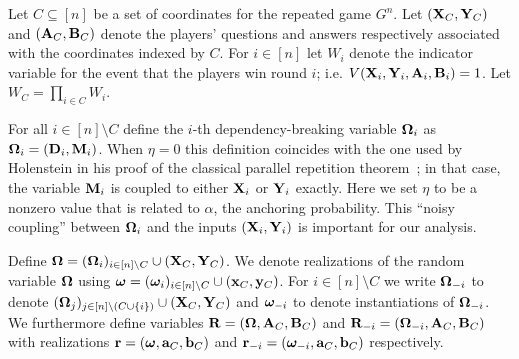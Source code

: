 Let $C \subseteq [n]$ be a set of coordinates for the repeated game $G^n$. 
Let $(\mathbf{X}_C,\mathbf{Y}_C)$ and $(\mathbf{A}_C,\mathbf{B}_C)$ denote the players' questions and answers respectively associated with the coordinates indexed by $C$. For $i \in [n]$ let $W_i$ denote the indicator variable for the event that the players win round $i$; i.e. $V(\mathbf{X}_i,\mathbf{Y}_i,\mathbf{A}_i,\mathbf{B}_i) = 1$. Let $W_C = \prod_{i \in C} W_i$. 

For all $i \in [n] \setminus C$ define the $i$-th dependency-breaking variable ${\boldsymbol{\Omega}}_i$ as ${\boldsymbol{\Omega}}_i = (\mathbf{D}_i,\mathbf{M}_i)$. When $\eta = 0$ this definition coincides with the one used by Holenstein in his proof of the classical parallel repetition theorem~\cite{Hol09}; in that case, the variable $\mathbf{M}_i$ is coupled to either $\mathbf{X}_i$ or $\mathbf{Y}_i$ exactly. Here we set $\eta$ to be a nonzero value that is related to $\alpha$, the anchoring probability. This ``noisy coupling'' between ${\boldsymbol{\Omega}}_i$ and the inputs $(\mathbf{X}_i,\mathbf{Y}_i)$ is important for our analysis. 




Define ${\boldsymbol{\Omega}} = ({\boldsymbol{\Omega}}_i)_{i \in [n] \setminus C} \cup (\mathbf{X}_C,\mathbf{Y}_C)$. We denote realizations of the random variable ${\boldsymbol{\Omega}}$ using ${\boldsymbol{\omega}} = ({\boldsymbol{\omega}}_i)_{i \in [n] \setminus C} \cup (\mathbf{x}_C,\mathbf{y}_C)$. For $i \in [n] \setminus C$ we write ${\boldsymbol{\Omega}}_{-i}$ to denote $({\boldsymbol{\Omega}}_j)_{j \in [n] \setminus (C \cup \{i\})} \cup (\mathbf{X}_C,\mathbf{Y}_C)$ and ${\boldsymbol{\omega}}_{-i}$ to denote instantiations of ${\boldsymbol{\Omega}}_{-i}$. We furthermore define variables $\mathbf{R} = ({\boldsymbol{\Omega}},\mathbf{A}_C,\mathbf{B}_C)$ and $\mathbf{R}_{-i} = ({\boldsymbol{\Omega}}_{-i},\mathbf{A}_C,\mathbf{B}_C)$ with realizations $\mathbf{r} = ({\boldsymbol{\omega}},\mathbf{a}_C,\mathbf{b}_C)$ and $\mathbf{r}_{-i} = ({\boldsymbol{\omega}}_{-i},\mathbf{a}_C,\mathbf{b}_C)$ respectively.



%
%
% 
